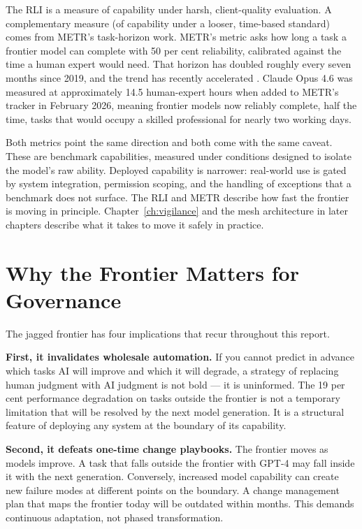 The RLI is a measure of capability under harsh, client-quality evaluation. A complementary measure (of capability under a looser, time-based standard) comes from METR's task-horizon work. METR's metric asks how long a task a frontier model can complete with 50 per cent reliability, calibrated against the time a human expert would need. That horizon has doubled roughly every seven months since 2019, and the trend has recently accelerated \parencite{METR2026}. Claude Opus 4.6 was measured at approximately 14.5 human-expert hours when added to METR's tracker in February 2026, meaning frontier models now reliably complete, half the time, tasks that would occupy a skilled professional for nearly two working days.

Both metrics point the same direction and both come with the same caveat. These are benchmark capabilities, measured under conditions designed to isolate the model's raw ability. Deployed capability is narrower: real-world use is gated by system integration, permission scoping, and the handling of exceptions that a benchmark does not surface. The RLI and METR describe how fast the frontier is moving in principle. Chapter~\ref{ch:vigilance} and the mesh architecture in later chapters describe what it takes to move it safely in practice.

\section{Why the Frontier Matters for Governance}

The jagged frontier has four implications that recur throughout this report.

\textbf{First, it invalidates wholesale automation.} If you cannot predict in advance which tasks AI will improve and which it will degrade, a strategy of replacing human judgment with AI judgment is not bold --- it is uninformed. The 19 per cent performance degradation on tasks outside the frontier is not a temporary limitation that will be resolved by the next model generation. It is a structural feature of deploying any system at the boundary of its capability.

\textbf{Second, it defeats one-time change playbooks.} The frontier moves as models improve. A task that falls outside the frontier with GPT-4 may fall inside it with the next generation. Conversely, increased model capability can create new failure modes at different points on the boundary. A change management plan that maps the frontier today will be outdated within months. This demands continuous adaptation, not phased transformation.

